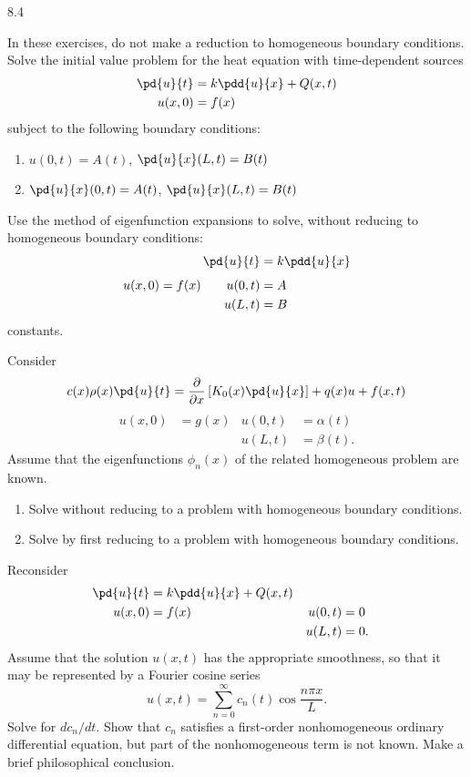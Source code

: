 \begin{exercises}{8.4}

\item In these exercises, do not make a reduction to homogeneous boundary conditions.  Solve the initial value problem for the heat equation with time-dependent sources
\begin{align*}
\pd{u}{t} &= k\pdd{u}{x} + Q(x,t) \\
u(x,0) &= f(x)
\end{align*}
subject to the following boundary conditions:
\begin{enumerate}
\item[(a)] $u(0,t) = A(t)$, \quad $\pd{u}{x}(L,t) = B(t)$
\item[\starred(b)] $\pd{u}{x}(0,t) = A(t)$, \quad $\pd{u}{x}(L,t) = B(t)$
\end{enumerate}

\item Use the method of eigenfunction expansions to solve, without reducing to homogeneous boundary conditions:
\begin{align*}
\pd{u}{t} &= k\pdd{u}{x} \\[4pt]
u(x,0) = f(x)\qquad u(0,t) &= A \\ u(L,t) &= B
\end{align*}
constants.

\item Consider
\[
c(x)\rho(x)\pd{u}{t} = \frac{\partial}{\partial x}\left[K_0(x)\pd{u}{x}\right] + q(x)u + f(x,t)
\]
\begin{align*}
u(x,0) &= g(x) & u(0,t) &= \alpha(t) \\
& & u(L,t) &= \beta(t).
\end{align*}
Assume that the eigenfunctions $\phi_n(x)$ of the related homogeneous problem are known.
\begin{enumerate}
\item[(a)] Solve without reducing to a problem with homogeneous boundary conditions.
\item[(b)] Solve by first reducing to a problem with homogeneous boundary conditions.
\end{enumerate}

\item Reconsider
\begin{align*}
\pd{u}{t} &= k\pdd{u}{x} + Q(x,t) \\
u(x,0) &= f(x) & u(0,t) &= 0 \\
& & u(L,t) &= 0.
\end{align*}
Assume that the solution $u(x,t)$ has the appropriate smoothness, so that it may be represented by a Fourier cosine series
\[
u(x,t) = \sum_{n=0}^{\infty} c_n(t)\cos\frac{n\pi x}{L}.
\]
Solve for $dc_n/dt$.  Show that $c_n$ satisfies a first-order nonhomogeneous ordinary differential equation, but part of the nonhomogeneous term is not known.  Make a brief philosophical conclusion.

\end{exercises}
